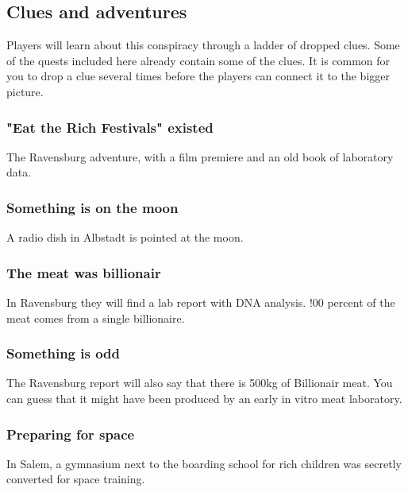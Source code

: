 \subsection{Clues and adventures}

Players will learn about this conspiracy through a ladder of dropped clues. Some of the quests included here already contain some of the clues. It is common for you to drop a clue several times before the players can connect it to the bigger picture.

\subsubsection{"Eat the Rich Festivals" existed}

The Ravensburg adventure, with a film premiere and an old book of laboratory data.

\subsubsection{Something is on the moon}

A radio dish in Albstadt is pointed at the moon.

\subsubsection{The meat was billionair}

In Ravensburg they will find a lab report with DNA analysis. !00 percent of the meat comes from a single billionaire.

\subsubsection{Something is odd}

The Ravensburg report will also say that there is 500kg of Billionair meat. You can guess that it might have been produced by an early in vitro meat laboratory.

\subsubsection{Preparing for space}

In Salem, a gymnasium next to the boarding school for rich children was secretly converted for space training.








